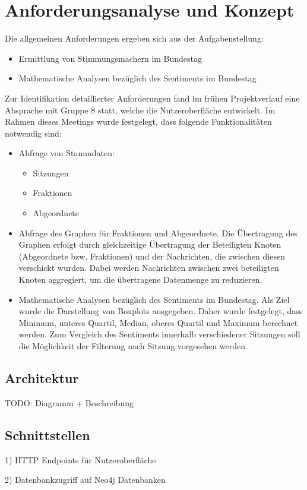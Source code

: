 \section{Anforderungsanalyse und Konzept}

Die allgemeinen Anforderungen ergeben sich aus der Aufgabenstellung:
\begin{itemize}
  \item Ermittlung von Stimmungsmachern im Bundestag
  \item Mathematische Analysen bezüglich des Sentiments im Bundestag
\end{itemize}

Zur Identifikation detaillierter Anforderungen fand im frühen Projektverlauf eine Absprache mit Gruppe 8 statt, welche die Nutzeroberfläche entwickelt.
Im Rahmen dieses Meetings wurde festgelegt, dass folgende Funktionalitäten notwendig sind:
\begin{itemize}
  \item Abfrage von Stammdaten:
    \begin{itemize}
      \item Sitzungen
      \item Fraktionen
      \item Abgeordnete
    \end{itemize}
  \item Abfrage des Graphen für Fraktionen und Abgeordnete. Die Übertragung des Graphen erfolgt durch gleichzeitige Übertragung der Beteiligten Knoten (Abgeordnete bzw. Fraktionen) und der Nachrichten, die zwischen diesen verschickt wurden. Dabei werden Nachrichten zwischen zwei beteiligten Knoten aggregiert, um die übertragene Datenmenge zu reduzieren.
  \item Mathematische Analysen bezüglich des Sentiments im Bundestag. Als Ziel wurde die Darstellung von Boxplots ausgegeben. Daher wurde festgelegt, dass Minimum, unteres Quartil, Median, oberes Quartil und Maximum berechnet werden. Zum Vergleich des Sentiments innerhalb verschiedener Sitzungen soll die Möglichkeit der Filterung nach Sitzung vorgesehen werden.
\end{itemize}



\subsection{Architektur}

TODO: Diagramm + Beschreibung

\subsection{Schnittstellen}

1) HTTP Endpoints für Nutzeroberfläche

2) Datenbankzugriff auf Neo4j Datenbanken
